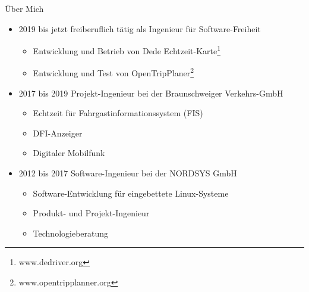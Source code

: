 
\begin{frame}{Über Mich}
  \begin{itemize}
  \item<1-1> 2019 bis jetzt freiberuflich tätig als Ingenieur für Software-Freiheit
    \begin{itemize}
    \item<1-1> Entwicklung und Betrieb von Dede Echtzeit-Karte\footnote{www.dedriver.org}
    \item<1-1> Entwicklung und Test von OpenTripPlaner\footnote{www.opentripplanner.org}
    \end{itemize}
  \item<2-2> 2017 bis 2019 Projekt-Ingenieur bei der Braunschweiger Verkehrs-GmbH
    \begin{itemize}
    \item<2-2> Echtzeit für Fahrgastinformationssystem (FIS)
    \item<2-2> DFI-Anzeiger
    \item<2-2> Digitaler Mobilfunk
    \end{itemize}
  \item<3-3> 2012 bis 2017 Software-Ingenieur bei der NORDSYS GmbH
    \begin{itemize}
    \item<3-3> Software-Entwicklung für eingebettete Linux-Systeme
    \item<3-3> Produkt- und Projekt-Ingenieur
    \item<3-3> Technologieberatung
    \end{itemize}
  \end{itemize}
\end{frame}
